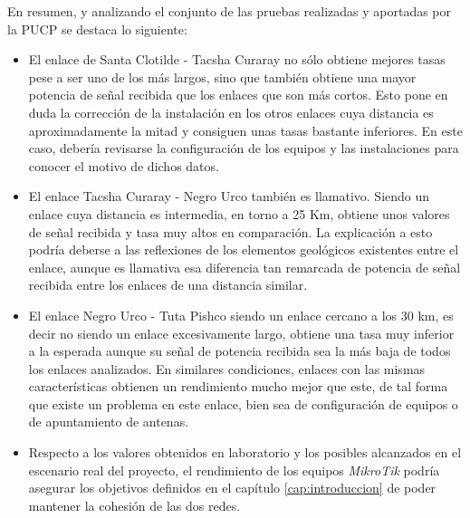 En resumen, y analizando el conjunto de las pruebas realizadas y aportadas por la PUCP se destaca lo siguiente:

\begin{itemize}
	\item El enlace de Santa Clotilde - Tacsha Curaray no sólo obtiene mejores tasas pese a ser uno de los más largos, sino que también obtiene una mayor potencia de señal recibida que los enlaces que son más cortos. Esto pone en duda la corrección de la instalación en los otros enlaces cuya distancia es aproximadamente la mitad y consiguen unas tasas bastante inferiores. En este caso, debería revisarse la configuración de los equipos y las instalaciones para conocer el motivo de dichos datos. 
	
	\item El enlace Tacsha Curaray - Negro Urco también es llamativo. Siendo un enlace cuya distancia es intermedia, en torno a 25 Km, obtiene unos valores de señal recibida y tasa muy altos en comparación. La explicación a esto podría deberse a las reflexiones de los elementos geológicos existentes entre el enlace, aunque es llamativa esa diferencia tan remarcada de potencia de señal recibida entre los enlaces de una distancia similar.
	
	\item El enlace Negro Urco - Tuta Pishco siendo un enlace cercano a los 30 km, es decir no siendo un enlace excesivamente largo, obtiene una tasa muy inferior a la esperada aunque su señal de potencia recibida sea la más baja de todos los enlaces analizados. En similares condiciones, enlaces con las mismas características obtienen un rendimiento mucho mejor que este, de tal forma que existe un problema en este enlace, bien sea de configuración de equipos o de apuntamiento de antenas.
	
	\item Respecto a los valores obtenidos en laboratorio y los posibles alcanzados en el escenario real del proyecto, el rendimiento de los equipos \textit{MikroTik} podría asegurar los objetivos definidos en el capítulo \ref{cap:introduccion} de poder mantener la cohesión de las dos redes. 
\end{itemize}
